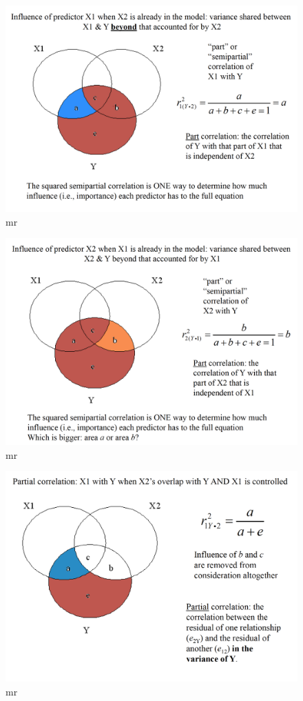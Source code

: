\documentclass[]{book}
\theoremstyle{definition}
\theoremstyle{definition}
\theoremstyle{definition}
\theoremstyle{remark}
\begin{document}
\begin{figure}
\centering
\includegraphics{img/hicksmr15.png}
\caption{mr}
\end{figure}

\begin{figure}
\centering
\includegraphics{img/hicksmr16.png}
\caption{mr}
\end{figure}

\begin{figure}
\centering
\includegraphics{img/hicksmr17.png}
\caption{mr}
\end{figure}
\end{document}

